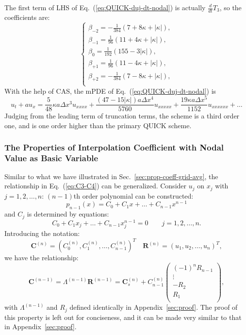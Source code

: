 \documentclass[]{article}
\def\Matrix#1{\left(#1\right)}
\def\Matrix#1{\left(#1\right)}
\def\abs#1{\left|#1\right|}
\begin{document}
The first term of LHS of Eq.~(\ref{eq:QUICK-duj-dt-nodal}) is actually
$\frac{d}{dt}T_3$, so the coefficients are:
\[
\left\{\begin{array}{l}
\displaystyle
\beta_{-2} = -\frac{1}{384} (7+8\kappa+\abs{\kappa}),\\[4mm]
\displaystyle
\beta_{-1} = \frac{1}{96} (11+4\kappa+\abs{\kappa}),\\[4mm]
\displaystyle
\beta_{0} = \frac{1}{192} (155-3\abs{\kappa}),\\[4mm]
\displaystyle
\beta_{+1} = \frac{1}{96} (11-4\kappa+\abs{\kappa}),\\[4mm]
\displaystyle
\beta_{+2} = -\frac{1}{384} (7-8\kappa+\abs{\kappa}),\\[4mm]
\end{array}\right.
\]
With the help of CAS, the mPDE of Eq.~(\ref{eq:QUICK-duj-dt-nodal})
is
\[
u_t+au_x=\frac{5}{48}\kappa a\Delta x^3 u_{xxxx} +
\frac{(47-15\abs{\kappa})a\Delta x^4 }{5760}u_{xxxxx} + \frac{19\kappa
a\Delta x^5}{1152}u_{xxxxxx}+\ldots
\]
Judging from the leading term of truncation terms, the scheme is a third order
one, and is one order higher than the primary QUICK scheme.

\subsubsection{The Properties of Interpolation Coefficient with Nodal Value as Basic Variable}\label{sec:prop-coeff-nodal-value}
Similar to what we have illustrated in Sec.~\ref{sec:prop-coeff-grid-avg}, the
relationship in Eq.~(\ref{eq:C3-C4}) can be generalized. Consider $u_j$ on
$x_j$ with $j=1,2,\dots,n$: $(n-1)$th order polynomial can be constructed:
\[
p_{n-1}(x) = C_0 + C_1 x + \dots + C_{n-1} x^{n-1}
\]
and $C_j$ is determined by equations:
\[
C_0 + C_1 x_j + \dots + C_{n-1}x_j^{n-1} = 0\qquad j=1,2,\dots,n.
\]
Introducing the notation:
\[
\bm C^{(n)} = (C_0^{(n)}, C_1^{(n)}, \dots, C_{n-1}^{(n)})^T \quad
\bm R^{(n)} = (u_1, u_2, \dots, u_n)^T,
\]
we have the relationship:
\[
\bm C^{(n-1)}=\Lambda^{(n-1)}\bm R^{(n-1)}=\bm C^{(n)}_s +
C^{(n)}_{n-1}\Matrix{\begin{array}{r}(-1)^nR_{n-1}\\ \vdots\ \ \\ -R_2\\ R_1 \\
\end{array}},
\]
with $\Lambda^{(n-1)}$ and $R_j$ defined identically in
Appendix~\ref{sec:proof}. The proof of this property is left out for
conciseness, and it can be made very similar to that in
Appendix~\ref{sec:proof}.
\end{document}
